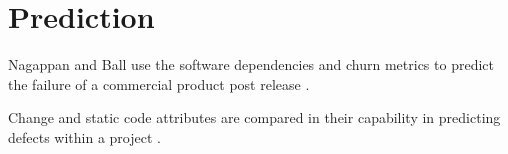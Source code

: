 






\section{Prediction}


Nagappan and Ball use the software dependencies and churn metrics to predict the failure of a commercial product post release \cite{Nagappan2007}.

Change and static code attributes are compared in their capability in predicting defects within a project \cite{Moser2008}.

